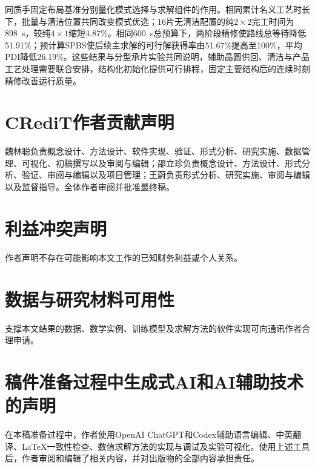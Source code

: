 \documentclass[final,5p,times,twocolumn]{elsarticle}
\begin{document}
同质手固定布局基准分别量化模式选择与求解组件的作用。相同累计名义工艺时长下，批量与清洁位置共同改变模式优选；16片无清洁配置的纯$2\times2$完工时间为898~s，较纯$4\times1$缩短4.87\%。相同600~s总预算下，两阶段精修使路线总等待降低51.91\%；预计算SPBS使后续主求解的可行解获得率由51.67\%提高至100\%，平均PDI降低26.19\%。这些结果与分型承片实验共同说明，辅助晶圆供回、清洁与产品工艺处理需要联合安排，结构化初始化提供可行排程，固定主要结构后的连续时刻精修改善运行质量。

\section*{CRediT作者贡献声明}
魏林聪负责概念设计、方法设计、软件实现、验证、形式分析、研究实施、数据管理、可视化、初稿撰写以及审阅与编辑；邵立珍负责概念设计、方法设计、形式分析、验证、审阅与编辑以及项目管理；王蔚负责形式分析、研究实施、审阅与编辑以及监督指导。全体作者审阅并批准最终稿。

\section*{利益冲突声明}
作者声明不存在可能影响本文工作的已知财务利益或个人关系。

\section*{数据与研究材料可用性}
支撑本文结果的数据、数学实例、训练模型及求解方法的软件实现可向通讯作者合理申请。

\section*{稿件准备过程中生成式AI和AI辅助技术的声明}
在本稿准备过程中，作者使用OpenAI ChatGPT和Codex辅助语言编辑、中英翻译、LaTeX一致性检查、数值求解方法的实现与调试及实验可视化。使用上述工具后，作者审阅和编辑了相关内容，并对出版物的全部内容承担责任。
\end{document}
